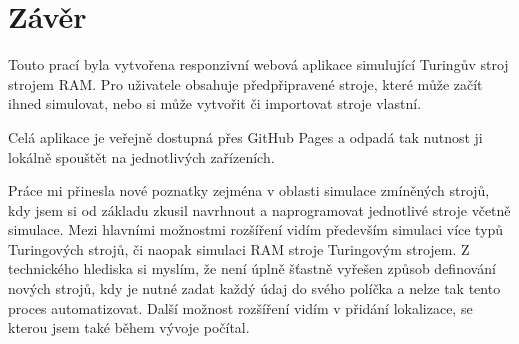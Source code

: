\chapter{Závěr}
Touto prací byla vytvořena responzivní webová aplikace simulující Turingův stroj strojem RAM.
Pro uživatele obsahuje předpřipravené stroje, které může začít ihned simulovat, nebo si může vytvořit či importovat stroje vlastní.

Celá aplikace je veřejně dostupná přes GitHub Pages a odpadá tak nutnost ji lokálně spouštět na jednotlivých zařízeních.

Práce mi přinesla nové poznatky zejména v oblasti simulace zmíněných strojů, 
kdy jsem si od základu zkusil navrhnout a naprogramovat jednotlivé stroje včetně simulace.
Mezi hlavními možnostmi rozšíření vidím především simulaci více typů Turingových strojů, 
či naopak simulaci RAM stroje Turingovým strojem. 
Z technického hlediska si myslím, že není úplně šťastně vyřešen způsob definování nových strojů, 
kdy je nutné zadat každý údaj do svého políčka a nelze tak tento proces automatizovat.
Další možnost rozšíření vidím v přidání lokalizace, se kterou jsem také během vývoje počítal.
\endinput